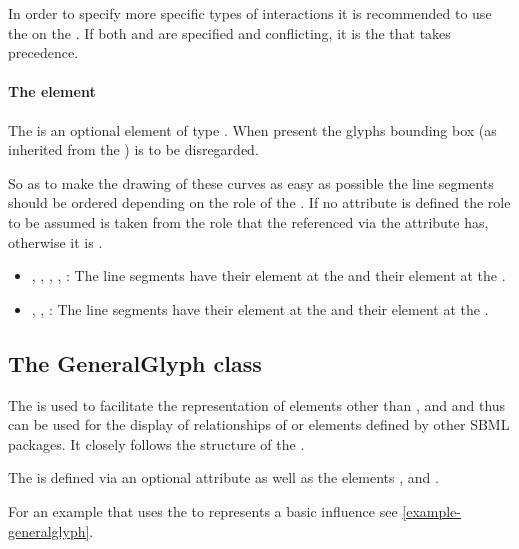 In order to specify more specific types of interactions it is 
recommended to use the  on the \SpeciesReference. If both
 and  are specified and conflicting, it is the 
 that takes precedence. 


\paragraph{The  element}
The  is an optional element of type \Curve. When present 
the glyphs bounding box (as inherited from the \GraphicalObject) is to 
be disregarded. 

So as to make the drawing of these curves as easy as possible the line 
segments should be ordered depending on the role of the 
\SpeciesReferenceGlyph. If no  attribute is defined the role 
to be assumed is taken from the role that the \SpeciesReference 
referenced via the attribute  has, otherwise it 
is . 


\begin{itemize}
	\item {, , , 
	, : The line segments have their 
	 element at the \ReactionGlyph and their  
	element at the \SpeciesGlyph.} 
	\item {, 
	, : The line segments have their 
	 element at the \SpeciesGlyph and their  element 
	at the \ReactionGlyph.} 
\end{itemize}

\subsection{The GeneralGlyph class}
\label{generalglyph-class}
The \GeneralGlyph is used to facilitate the representation of elements 
other than \Compartment, \Species and \Reaction and thus can be used for 
the display of relationships of \Rule or elements defined by other SBML 
packages. It closely follows the structure of the \ReactionGlyph. 

The \GeneralGlyph is defined via an optional attribute  
as well as the elements ,  and 
. 

For an example that uses the \GeneralGlyph to represents a basic influence
see \ref{example-generalglyph}.

